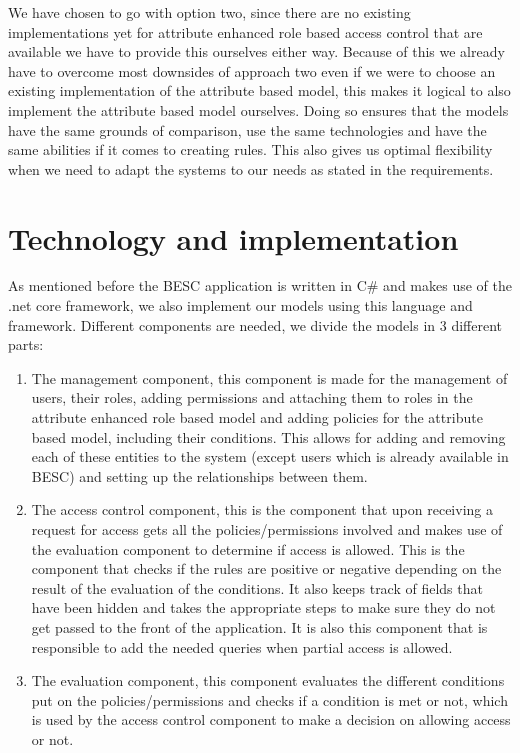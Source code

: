 \clearpage
We have chosen to go with option two, since there are no existing implementations yet for attribute enhanced role based access control that are available we have to provide this ourselves either way. 
Because of this we already have to overcome most downsides of approach two even if we were to choose an existing implementation of the attribute based model, this makes it logical to also implement the attribute based model ourselves.
Doing so ensures that the models have the same grounds of comparison, use the same technologies and have the same abilities if it comes to creating rules.
This also gives us optimal flexibility when we need to adapt the systems to our needs as stated in the requirements.

\section{Technology and implementation}
As mentioned before the BESC application is written in C\# and makes use of the .net core framework, we also implement our models using this language and framework.
Different components are needed, we divide the models in 3 different parts:
\begin{enumerate}
    \item The management component, this component is made for the management of users, their roles, adding permissions and attaching them to roles in the attribute enhanced role based model and adding policies for the attribute based model, including their conditions. 
    This allows for adding and removing each of these entities to the system (except users which is already available in BESC) and setting up the relationships between them.
    \item The access control component, this is the component that upon receiving a request for access gets all the policies/permissions involved and makes use of the evaluation component to determine if access is allowed. 
    This is the component that checks if the rules are positive or negative depending on the result of the evaluation of the conditions.
    It also keeps track of fields that have been hidden and takes the appropriate steps to make sure they do not get passed to the front of the application.
    It is also this component that is responsible to add the needed queries when partial access is allowed.
    \item The evaluation component, this component evaluates the different conditions put on the policies/permissions and checks if a condition is met or not, which is used by the access control component to make a decision on allowing access or not.
\end{enumerate}


